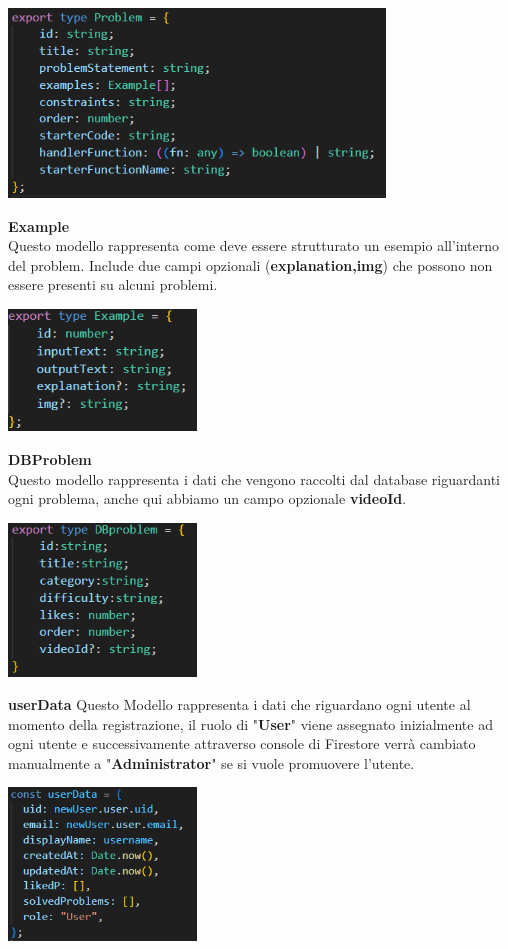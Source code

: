 \documentclass[11pt, a4paper]{article}
\theoremstyle{definition}
\begin{document}
\begin{center}
  \includegraphics[width=10cm]{materiale/Problem Template.png}
\end{center}
\newpage
\textbullet   \textbf{ Example}\\
Questo modello rappresenta come deve essere strutturato un esempio all'interno del problem. Include due campi opzionali (\textbf{explanation,img}) che possono non essere presenti su alcuni problemi.

\begin{center}
  \includegraphics[width=5cm]{materiale/Example Template.png}
\end{center}

\newpage
\textbullet   \textbf{ DBProblem}\\
Questo modello rappresenta i dati che vengono raccolti dal database riguardanti ogni problema, anche qui abbiamo un campo opzionale \textbf{videoId}.
\begin{center}
  \includegraphics[width=5cm]{materiale/DBProblem Template.png}
\end{center}
\newpage
\textbullet \textbf{ userData}
Questo Modello rappresenta i dati che riguardano ogni utente al momento della registrazione, il ruolo di "\textbf{User}" viene assegnato inizialmente ad ogni utente e successivamente attraverso console di Firestore verrà cambiato manualmente a "\textbf{Administrator}"
se si vuole promuovere l'utente.
\begin{center}
  \includegraphics[width=5cm]{materiale/User Template.png}
\end{center}
\newpage
\end{document}
